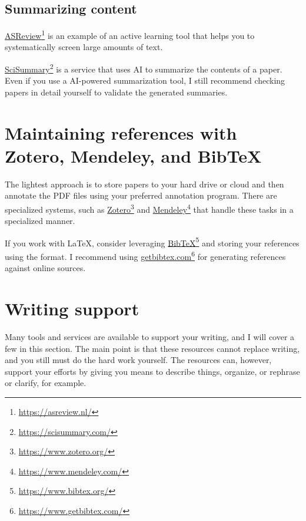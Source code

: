 \subsection{Summarizing content}

\href{https://asreview.nl/}{ASReview}\footnote{\url{https://asreview.nl/}} is an example of an active learning tool that helps you to systematically screen large amounts of text.

\href{https://scisummary.com/}{SciSummary}\footnote{\url{https://scisummary.com/}} is a service that uses AI to summarize the contents of a paper.
Even if you use a AI-powered summarization tool, I still recommend checking papers in detail yourself to validate the generated summaries.

\section{Maintaining references with Zotero, Mendeley, and BibTeX}


The lightest approach is to store papers to your hard drive or cloud and then annotate the PDF files using your preferred annotation program.
There are specialized systems, such as \href{https://www.zotero.org/}{Zotero}\footnote{\url{https://www.zotero.org/}} and \href{https://www.mendeley.com/}{Mendeley}\footnote{\url{https://www.mendeley.com/}} that handle these tasks in a specialized manner.

If you work with LaTeX, consider leveraging \href{https://www.bibtex.org/}{BibTeX}\footnote{\url{https://www.bibtex.org/}} and storing your references using the format.
I recommend using \href{https://www.getbibtex.com/}{getbibtex.com}\footnote{\url{https://www.getbibtex.com/}} for generating references against online sources.

\section{Writing support}

Many tools and services are available to support your writing, and I will cover a few in this section.
The main point is that these resources cannot replace writing, and you still must do the hard work yourself.
The resources can, however, support your efforts by giving you means to describe things, organize, or rephrase or clarify, for example.

